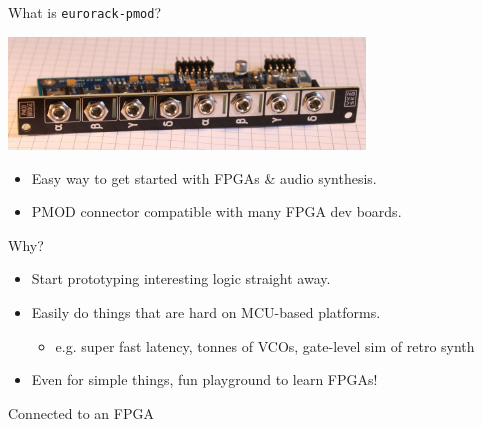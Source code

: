 \documentclass{beamer}
\begin{document}
\begin{frame}{What is \texttt{eurorack-pmod}?}

    \begin{center}
        \includegraphics[height=3cm]{img/eurorack-pmod.jpg}
    \end{center}

    \begin{itemize}
        \item Easy way to get started with FPGAs \& audio synthesis.
        \item PMOD connector compatible with many FPGA dev boards.
    \end{itemize}

    \begin{block}{Why?}
        \begin{itemize}
            \item Start prototyping interesting logic straight away.
            \item Easily do things that are hard on MCU-based platforms.
                \begin{itemize}
                    \item e.g. super fast latency, tonnes of VCOs, gate-level sim of retro synth
                \end{itemize}
            \item Even for simple things, fun playground to learn FPGAs!
        \end{itemize}
    \end{block}

\end{frame}

\begin{frame}{Connected to an FPGA}


\end{frame}
\end{document}
